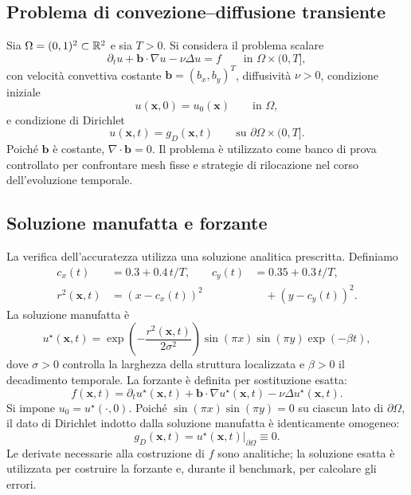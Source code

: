 \subsection{Problema di convezione--diffusione transiente}

Sia $\Omega=(0,1)^2\subset\mathbb{R}^2$ e sia $T>0$. Si considera il problema scalare
\begin{equation}
\partial_t u+\bm b\cdot\nabla u-\nu\Delta u=f
\qquad\text{in }\Omega\times(0,T],
\label{eq:pde}
\end{equation}
con velocità convettiva costante $\bm b=(b_x,b_y)^T$, diffusività $\nu>0$, condizione iniziale
\begin{equation}
u(\bm x,0)=u_0(\bm x)\qquad \text{in }\Omega,
\label{eq:initial}
\end{equation}
e condizione di Dirichlet
\begin{equation}
u(\bm x,t)=g_D(\bm x,t)
\qquad \text{su }\partial\Omega\times(0,T].
\label{eq:dirichlet}
\end{equation}
Poiché $\bm b$ è costante, $\nabla\cdot\bm b=0$. Il problema è utilizzato come banco di prova controllato per confrontare mesh fisse e strategie di rilocazione nel corso dell'evoluzione temporale.

\subsection{Soluzione manufatta e forzante}

La verifica dell'accuratezza utilizza una soluzione analitica prescritta. Definiamo
\begin{align}
c_x(t)&=0.3+0.4\,t/T,
&c_y(t)&=0.35+0.3\,t/T,\\
r^2(\bm x,t)&=(x-c_x(t))^2
& &\quad +(y-c_y(t))^2.
\end{align}
La soluzione manufatta è
\begin{equation}
u^\star(\bm x,t)
=
\exp\!\left(-\frac{r^2(\bm x,t)}{2\sigma^2}\right)
\sin(\pi x)\sin(\pi y)\exp(-\beta t),
\label{eq:mms}
\end{equation}
dove $\sigma>0$ controlla la larghezza della struttura localizzata e $\beta>0$ il decadimento temporale. La forzante è definita per sostituzione esatta:
\begin{equation}
f(\bm x,t)=
\partial_tu^\star(\bm x,t)
+\bm b\cdot\nabla u^\star(\bm x,t)
-\nu\Delta u^\star(\bm x,t).
\label{eq:forcing}
\end{equation}
Si impone $u_0=u^\star(\cdot,0)$. Poiché $\sin(\pi x)\sin(\pi y)=0$ su ciascun lato di $\partial\Omega$, il dato di Dirichlet indotto dalla soluzione manufatta è identicamente omogeneo:
\begin{equation}
g_D(\bm x,t)=u^\star(\bm x,t)|_{\partial\Omega}\equiv0.
\label{eq:homogeneous_dirichlet}
\end{equation}
Le derivate necessarie alla costruzione di $f$ sono analitiche; la soluzione esatta è utilizzata per costruire la forzante e, durante il benchmark, per calcolare gli errori.

